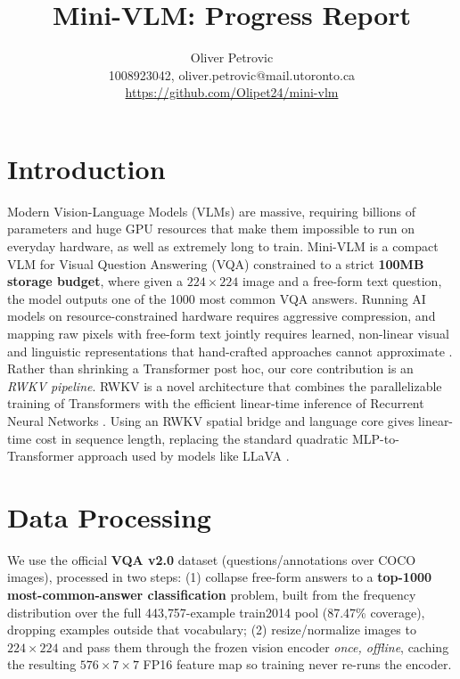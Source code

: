 \documentclass[final]{article}
\title{Mini-VLM: Progress Report}
\author{%
  Oliver Petrovic \\
  1008923042, oliver.petrovic@mail.utoronto.ca\\
  \url{https://github.com/Olipet24/mini-vlm}\\
}
\begin{document}
\maketitle

\vspace{-0.5in}

\section*{Introduction}

Modern Vision-Language Models (VLMs) are massive, requiring billions of parameters and huge GPU
resources that make them impossible to run on everyday hardware, as well as extremely long to train. Mini-VLM is a compact
VLM for Visual Question Answering (VQA) constrained to a strict \textbf{100MB storage budget}, where given a $224\times224$ image and a free-form text question, the model
outputs one of the 1000 most common VQA answers. Running AI models on
resource-constrained hardware requires aggressive compression, and mapping raw pixels with free-form text jointly requires learned, non-linear visual and linguistic representations that hand-crafted approaches cannot approximate \cite{goyal2017making}. Rather than shrinking a Transformer post hoc, our core contribution is an \emph{RWKV pipeline}. RWKV is a novel architecture that combines the parallelizable training of Transformers with the efficient linear-time inference of Recurrent Neural Networks \cite{peng2023rwkv}. Using an RWKV spatial bridge and language core gives linear-time cost in sequence length, replacing the standard quadratic MLP-to-Transformer approach used by models like LLaVA \cite{liu2023visual}.

\section*{Data Processing}

We use the official \textbf{VQA v2.0} dataset (questions/annotations over COCO images), processed
in two steps: (1) collapse free-form answers to a \textbf{top-1000
most-common-answer classification} problem, built from the frequency distribution over the full
443{,}757-example train2014 pool (87.47\% coverage), dropping examples outside that vocabulary;
(2) resize/normalize images to $224\times224$ and pass them through the frozen vision encoder
\emph{once, offline}, caching the resulting $576\times7\times7$ FP16 feature map so training
never re-runs the encoder.
\end{document}
